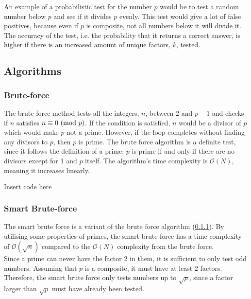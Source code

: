 \documentclass[main.tex]{subfiles}
\begin{document}
An example of a probabilistic test for the number $p$ would be to test a random
number below $p$ and see if it divides $p$ evenly. This test would give a lot of
false positives, because even if $p$ is composite, not all numbers below it will
divide it. The accuracy of the test, i.e. the probability that it returns a
correct answer, is higher if there is an increased amount of unique factors,
$k$, tested.

\subsection{Algorithms}

\subsubsection{Brute-force} \label{brute} The brute force method tests all the
integers, $n$, between $2$ and $p-1$ and checks if $n$ satisfies $n \equiv 0
\ (\mathrm{mod}\ p)$. If the condition is satisfied, $n$ would be a divisor of $p$ which
would make $p$ not a prime. However, if the loop completes without finding any
divisors to $p$, then $p$ is prime. The brute force algorithm is a definite
test, since it follows the definition of a prime; $p$ is prime if and only if
there are no divisors except for 1 and $p$ itself. The algorithm's time
complexity is $\mathcal{O}(N)$, meaning it increases linearly. \newline

\begin{python}
  Insert code here
\end{python}

\subsubsection{Smart Brute-force}
The smart brute force is a variant of the brute force algorithm (\ref{brute}).
By utilising some properties of primes, the smart brute force has a time
complexity of $\mathcal{O}(\sqrt{n})$ compared to the $\mathcal{O}(N)$
complexity from the brute force. \\

Since a prime can never have the factor $2$ in them, it is sufficient to only
test odd numbers. Assuming that $p$ is a composite, it must have at least 2
factors. Therefore, the smart brute force only tests numbers up to $\sqrt{p}$,
since a factor larger than $\sqrt{p}$ must have already been tested. \newline
\end{document}
